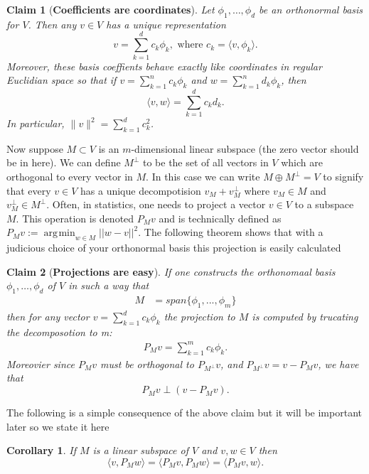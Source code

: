 \documentclass[11pt]{report}
\newtheorem{claim}{Claim}
\newtheorem{corollary}{Corollary}
\DeclareMathOperator*{\argmin}{\arg\!\min}
\begin{document}
\begin{claim}[{\bf Coefficients are coordinates}] Let $\phi_1,\ldots, \phi_d$ be an orthonormal basis for $V$. Then any $v\in V$ has a unique representation 
\[\boxed{ v = \sum_{k=1}^d c_k \phi_k,\,\,\text{where $c_k = \langle v, \phi_k\rangle$}.} \]
 Moreover, these basis coeffients behave exactly like coordinates in regular Euclidian space so that if $v = \sum_{k=1}^n c_k \phi_k$ and $w = \sum_{k=1}^n d_k \phi_k$, then
\[
\boxed{\langle v,w\rangle = \sum_{k=1}^d c_kd_k.}
\]
In particular,  $\| v \|^2 = \sum_{k=1}^d c_k^2$.
\end{claim}



Now suppose  $M\subset V$ is an $m$-dimensional linear subspace (the zero vector should be in here). We can define $M^{\perp}$ to be the set of all vectors in $V$ which are orthogonal to  every vector in $M$. In this case we can write $M \oplus M^{\perp} = V$ to signify that every $v\in V$ has a unique decompotision $v_M + v_M^\perp$ where $v_M\in M$ and $v_M^\perp \in M^\perp$. Often, in statistics, one needs to project a vector $v\in V$ to a subspace $M$. This operation is denoted $P_M v$ and is technically defined as $P_Mv := \argmin_{w \in M} ||w-v||^2 $. The following theorem shows that with a judicious choice of your orthonormal basis this projection is easily calculated

\begin{claim}[{\bf Projections are easy}] If one constructs the orthonomaal basis $\phi_1,\ldots, \phi_d$ of $V$ in such a way that
\begin{align*}
	M &= span\{\phi_1,...,\phi_m\} \label{span} 
\end{align*}
then for any vector $v=\sum_{k=1}^d c_k \phi_k$ the projection to $M$ is computed by trucating the decomposotion to m:
\begin{align}
\boxed{P_Mv = \sum\limits_{k=1}^m c_k\phi_k }.
\end{align}
Moreovier since $P_Mv$ must be orthogonal to  $P_{M^{\perp}}v$, and $P_{M^{\perp}}v = v - P_Mv$, we have that 
\[\boxed{P_Mv \perp (v - P_Mv).}\]

\end{claim}



The following is a simple consequence of the above claim but it will be important later so we state it here
\begin{corollary}
If $M$ is a linear subspace of $V$ and $v,w \in V$ then
\[\langle v, P_M w\rangle = \langle P_M v, P_M w\rangle = \langle P_M v,  w\rangle. \]  
\end{corollary}
\end{document}
